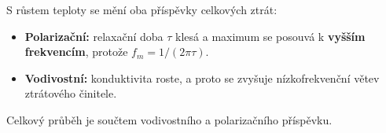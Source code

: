 S růstem teploty se mění oba příspěvky celkových ztrát:
\begin{itemize}
\item \textbf{Polarizační:} relaxační doba $\tau$ klesá a maximum se posouvá k \textbf{vyšším frekvencím}, protože $f_m=1/(2\pi\tau)$.
\item \textbf{Vodivostní:} konduktivita roste, a proto se zvyšuje nízkofrekvenční větev ztrátového činitele.
\end{itemize}
Celkový průběh je součtem vodivostního a polarizačního příspěvku.

